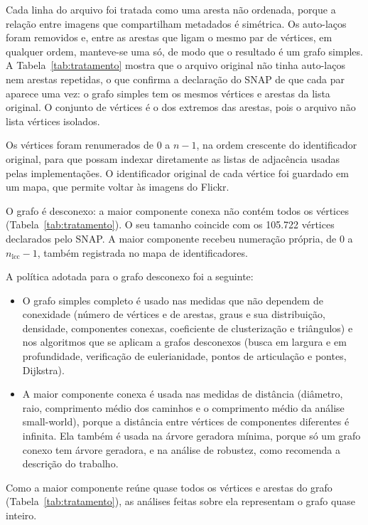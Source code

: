 Cada linha do arquivo foi tratada como uma aresta não ordenada, porque a relação entre imagens que compartilham metadados é simétrica. Os auto-laços foram removidos e, entre as arestas que ligam o mesmo par de vértices, em qualquer ordem, manteve-se uma só, de modo que o resultado é um grafo simples. A Tabela~\ref{tab:tratamento} mostra que o arquivo original não tinha auto-laços nem arestas repetidas, o que confirma a declaração do SNAP de que cada par aparece uma vez: o grafo simples tem os mesmos vértices e arestas da lista original. O conjunto de vértices é o dos extremos das arestas, pois o arquivo não lista vértices isolados.

Os vértices foram renumerados de $0$ a $n-1$, na ordem crescente do identificador original, para que possam indexar diretamente as listas de adjacência usadas pelas implementações. O identificador original de cada vértice foi guardado em um mapa, que permite voltar às imagens do Flickr.

O grafo é desconexo: a maior componente conexa não contém todos os vértices (Tabela~\ref{tab:tratamento}). O seu tamanho coincide com os 105.722 vértices declarados pelo SNAP. A maior componente recebeu numeração própria, de $0$ a $n_{\mathrm{lcc}}-1$, também registrada no mapa de identificadores.

A política adotada para o grafo desconexo foi a seguinte:
\begin{itemize}
  \item O grafo simples completo é usado nas medidas que não dependem de conexidade (número de vértices e de arestas, graus e sua distribuição, densidade, componentes conexas, coeficiente de clusterização e triângulos) e nos algoritmos que se aplicam a grafos desconexos (busca em largura e em profundidade, verificação de eulerianidade, pontos de articulação e pontes, Dijkstra).
  \item A maior componente conexa é usada nas medidas de distância (diâmetro, raio, comprimento médio dos caminhos e o comprimento médio da análise small-world), porque a distância entre vértices de componentes diferentes é infinita. Ela também é usada na árvore geradora mínima, porque só um grafo conexo tem árvore geradora, e na análise de robustez, como recomenda a descrição do trabalho.
\end{itemize}
Como a maior componente reúne quase todos os vértices e arestas do grafo (Tabela~\ref{tab:tratamento}), as análises feitas sobre ela representam o grafo quase inteiro.
